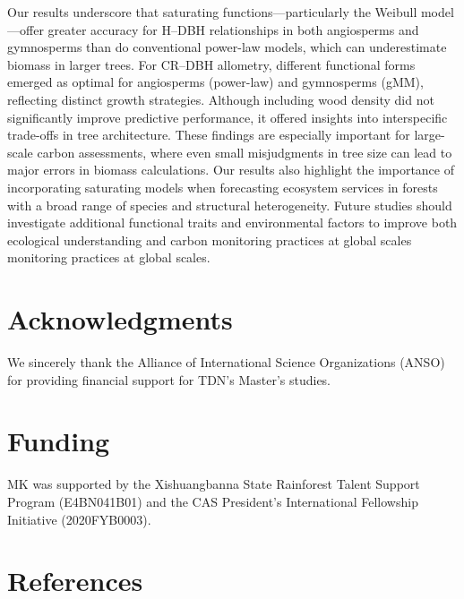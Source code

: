 \documentclass[
  12pt,
  letterpaper,
  DIV=11,
  numbers=noendperiod]{scrartcl}
\begin{document}
Our results underscore that saturating functions---particularly the
Weibull model---offer greater accuracy for H--DBH relationships in both
angiosperms and gymnosperms than do conventional power-law models, which
can underestimate biomass in larger trees. For CR--DBH allometry,
different functional forms emerged as optimal for angiosperms
(power-law) and gymnosperms (gMM), reflecting distinct growth
strategies. Although including wood density did not significantly
improve predictive performance, it offered insights into interspecific
trade-offs in tree architecture. These findings are especially important
for large-scale carbon assessments, where even small misjudgments in
tree size can lead to major errors in biomass calculations. Our results
also highlight the importance of incorporating saturating models when
forecasting ecosystem services in forests with a broad range of species
and structural heterogeneity. Future studies should investigate
additional functional traits and environmental factors to improve both
ecological understanding and carbon monitoring practices at global
scales monitoring practices at global scales.

\newpage

\hypertarget{acknowledgments}{%
\section*{Acknowledgments}\label{acknowledgments}}

We sincerely thank the Alliance of International Science Organizations
(ANSO) for providing financial support for TDN's Master's studies.

\hypertarget{funding}{%
\section*{Funding}\label{funding}}

MK was supported by the Xishuangbanna State Rainforest Talent Support
Program (E4BN041B01) and the CAS President's International Fellowship
Initiative (2020FYB0003).

\newpage

\hypertarget{references}{%
\section*{References}\label{references}}
\end{document}
